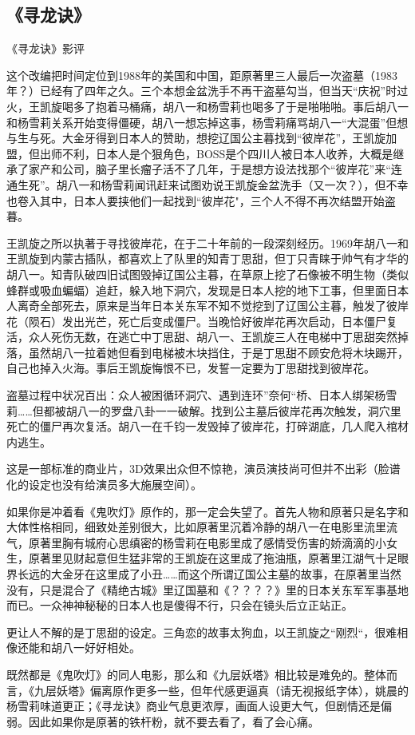 \subsection{《寻龙诀》}
《寻龙诀》影评

这个改编把时间定位到1988年的美国和中国，距原著里三人最后一次盗墓（1983年？）已经有了四年之久。三个本想金盆洗手不再干盗墓勾当，但当天“庆祝”时过火，王凯旋喝多了抱着马桶痛，胡八一和杨雪莉也喝多了于是啪啪啪。事后胡八一和杨雪莉关系开始变得僵硬，胡八一想忘掉这事，杨雪莉痛骂胡八一“大混蛋”但想与生与死。大金牙得到日本人的赞助，想挖辽国公主暮找到“彼岸花”，王凯旋加盟，但出师不利，日本人是个狠角色，BOSS是个四川人被日本人收养，大概是继承了家产和公司，脑子里长瘤子活不了几年，于是想方设法找那个“彼岸花”来“连通生死”。胡八一和杨雪莉闻讯赶来试图劝说王凯旋金盆洗手（又一次？），但不幸也卷入其中，日本人要挟他们一起找到“彼岸花"，三个人不得不再次结盟开始盗暮。

王凯旋之所以执著于寻找彼岸花，在于二十年前的一段深刻经历。1969年胡八一和王凯旋到内蒙古插队，都喜欢上了队里的知青丁思甜，但丁只青睐于帅气有才华的胡八一。知青队破四旧试图毁掉辽国公主暮，在草原上挖了石像被不明生物（类似蜂群或吸血蝙蝠）追赶，躲入地下洞穴，发现是日本人挖的地下工事，但里面日本人离奇全部死去，原来是当年日本关东军不知不觉挖到了辽国公主暮，触发了彼岸花（陨石）发出光芒，死亡后变成僵尸。当晚恰好彼岸花再次启动，日本僵尸复活，众人死伤无数，在逃亡中丁思甜、胡八一、王凯旋三人在电梯中丁思甜突然掉落，虽然胡八一拉着她但看到电梯被木块挡住，于是丁思甜不顾安危将木块踢开，自己也掉入火海。事后王凯旋悔恨不已，发誓一定要为丁思甜找到彼岸花。

盗墓过程中状况百出：众人被困循环洞穴、遇到连环”奈何“桥、日本人绑架杨雪莉……但都被胡八一的罗盘八卦一一破解。找到公主墓后彼岸花再次触发，洞穴里死亡的僵尸再次复活。胡八一在千钧一发毁掉了彼岸花，打碎湖底，几人爬入棺材内逃生。

这是一部标准的商业片，3D效果出众但不惊艳，演员演技尚可但并不出彩（脸谱化的设定也没有给演员多大施展空间）。

如果你是冲着看《鬼吹灯》原作的，那一定会失望了。首先人物和原著只是名字和大体性格相同，细致处差别很大，比如原著里沉着冷静的胡八一在电影里流里流气，原著里胸有城府心思缜密的杨雪莉在电影里成了感情受伤害的娇滴滴的小女生，原著里见财起意但生猛非常的王凯旋在这里成了拖油瓶，原著里江湖气十足眼界长远的大金牙在这里成了小丑……而这个所谓辽国公主墓的故事，在原著里当然没有，只是混合了《精绝古城》里辽国墓和《？？？？》里的日本关东军军事基地而已。一众神神秘秘的日本人也是傻得不行，只会在镜头后立正站正。

更让人不解的是丁思甜的设定。三角恋的故事太狗血，以王凯旋之“刚烈“，很难相像还能和胡八一好好相处。

既然都是《鬼吹灯》的同人电影，那么和《九层妖塔》相比较是难免的。整体而言，《九层妖塔》偏离原作更多一些，但年代感更逼真（请无视报纸字体），姚晨的杨雪莉味道更正；《寻龙诀》商业气息更浓厚，画面人设更大气，但剧情还是偏弱。因此如果你是原著的铁杆粉，就不要去看了，看了会心痛。